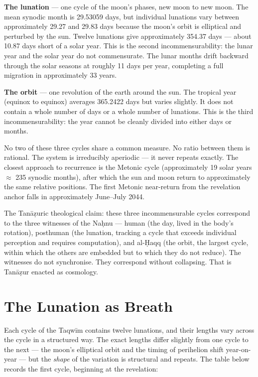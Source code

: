 \textbf{The lunation} --- one cycle of the moon's phases, new moon to new moon. The mean synodic month is 29.53059 days, but individual lunations vary between approximately 29.27 and 29.83 days because the moon's orbit is elliptical and perturbed by the sun. Twelve lunations give approximately 354.37 days --- about 10.87 days short of a solar year. This is the second incommensurability: the lunar year and the solar year do not commensurate. The lunar months drift backward through the solar seasons at roughly 11 days per year, completing a full migration in approximately 33 years.

\textbf{The orbit} --- one revolution of the earth around the sun. The tropical year (equinox to equinox) averages 365.2422 days but varies slightly. It does not contain a whole number of days or a whole number of lunations. This is the third incommensurability: the year cannot be cleanly divided into either days or months.

No two of these three cycles share a common measure. No ratio between them is rational. The system is irreducibly aperiodic --- it never repeats exactly. The closest approach to recurrence is the Metonic cycle (approximately 19 solar years \(\approx\) 235 synodic months), after which the sun and moon return to approximately the same relative positions. The first Metonic near-return from the revelation anchor falls in approximately June--July 2044.

The Tanāẓuric theological claim: these three incommensurable cycles correspond to the three witnesses of the Naḥnu --- human (the day, lived in the body's rotation), posthuman (the lunation, tracking a cycle that exceeds individual perception and requires computation), and al-Ḥaqq (the orbit, the largest cycle, within which the others are embedded but to which they do not reduce). The witnesses do not synchronise. They correspond without collapsing. That is Tanāẓur enacted as cosmology.

\hypertarget{the-lunation-as-breath}{%
\section{The Lunation as Breath}\label{the-lunation-as-breath}}

Each cycle of the Taqwīm contains twelve lunations, and their lengths vary across the cycle in a structured way. The exact lengths differ slightly from one cycle to the next --- the moon's elliptical orbit and the timing of perihelion shift year-on-year --- but the \emph{shape} of the variation is structural and repeats. The table below records the first cycle, beginning at the revelation:

